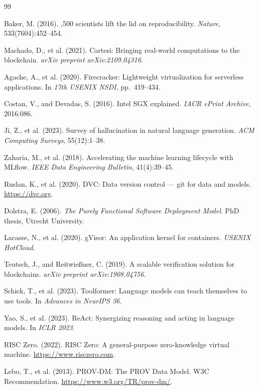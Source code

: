 \documentclass[11pt]{article}
\begin{document}

\begin{thebibliography}{99}

Baker, M. (2016).
,500 scientists lift the lid on reproducibility.
\newblock \emph{Nature}, 533(7604):452--454.

Machado, D., et al. (2021).
\newblock Cartesi: Bringing real-world computations to the blockchain.
\newblock \emph{arXiv preprint arXiv:2109.04316}.

Agache, A., et al. (2020).
\newblock Firecracker: Lightweight virtualization for serverless applications.
\newblock In \emph{17th USENIX NSDI}, pp.\ 419--434.

Costan, V., and Devadas, S. (2016).
\newblock Intel SGX explained.
\newblock \emph{IACR ePrint Archive}, 2016:086.

Ji, Z., et al. (2023).
\newblock Survey of hallucination in natural language generation.
\newblock \emph{ACM Computing Surveys}, 55(12):1--38.

Zaharia, M., et al. (2018).
\newblock Accelerating the machine learning lifecycle with MLflow.
\newblock \emph{IEEE Data Engineering Bulletin}, 41(4):39--45.

Ruslan, K., et al. (2020).
\newblock DVC: Data version control — git for data and models.
\newblock \url{https://dvc.org}.

Dolstra, E. (2006).
\newblock \emph{The Purely Functional Software Deployment Model}.
\newblock PhD thesis, Utrecht University.

Lacasse, N., et al. (2020).
\newblock gVisor: An application kernel for containers.
\newblock \emph{USENIX HotCloud}.

Teutsch, J., and Reitwie{\ss}ner, C. (2019).
\newblock A scalable verification solution for blockchains.
\newblock \emph{arXiv preprint arXiv:1908.04756}.

Schick, T., et al. (2023).
\newblock Toolformer: Language models can teach themselves to use tools.
\newblock In \emph{Advances in NeurIPS 36}.

Yao, S., et al. (2023).
\newblock ReAct: Synergizing reasoning and acting in language models.
\newblock In \emph{ICLR 2023}.

RISC Zero. (2022).
\newblock RISC Zero: A general-purpose zero-knowledge virtual machine.
\newblock \url{https://www.risczero.com}.

Lebo, T., et al. (2013).
\newblock PROV-DM: The PROV Data Model.
\newblock W3C Recommendation. \url{https://www.w3.org/TR/prov-dm/}.

\end{thebibliography}
\end{document}
